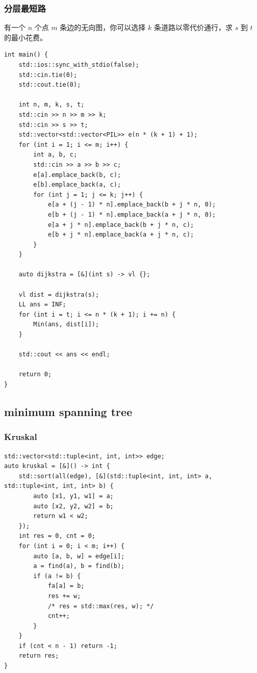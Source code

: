 \documentclass[UTF8, a4paper, titlepage, twoside]{ctexart}
\begin{document}
\subsubsection*{ 分层最短路 }

有一个 $n$ 个点 $m$ 条边的无向图，你可以选择 $k$ 条道路以零代价通行，求 $s$ 到 $t$ 的最小花费。

\begin{lstlisting}[style=cpp]
int main() {
    std::ios::sync_with_stdio(false);
    std::cin.tie(0);
    std::cout.tie(0);

    int n, m, k, s, t;
    std::cin >> n >> m >> k;
    std::cin >> s >> t;
    std::vector<std::vector<PIL>> e(n * (k + 1) + 1);
    for (int i = 1; i <= m; i++) {
        int a, b, c;
        std::cin >> a >> b >> c;
        e[a].emplace_back(b, c);
        e[b].emplace_back(a, c);
        for (int j = 1; j <= k; j++) {
            e[a + (j - 1) * n].emplace_back(b + j * n, 0);
            e[b + (j - 1) * n].emplace_back(a + j * n, 0);
            e[a + j * n].emplace_back(b + j * n, c);
            e[b + j * n].emplace_back(a + j * n, c);
        }
    }

    auto dijkstra = [&](int s) -> vl {};

    vl dist = dijkstra(s);
    LL ans = INF;
    for (int i = t; i <= n * (k + 1); i += n) {
        Min(ans, dist[i]);
    }

    std::cout << ans << endl;

    return 0;
}
\end{lstlisting}

\subsection{ minimum spanning tree }
\subsubsection*{ Kruskal }
\begin{lstlisting}[style=cpp]
std::vector<std::tuple<int, int, int>> edge;
auto kruskal = [&]() -> int {
    std::sort(all(edge), [&](std::tuple<int, int, int> a, std::tuple<int, int, int> b) {
        auto [x1, y1, w1] = a;
        auto [x2, y2, w2] = b;
        return w1 < w2;
    });
    int res = 0, cnt = 0;
    for (int i = 0; i < m; i++) {
        auto [a, b, w] = edge[i];
        a = find(a), b = find(b);
        if (a != b) {
            fa[a] = b;
            res += w;
            /* res = std::max(res, w); */
            cnt++;
        }
    }
    if (cnt < n - 1) return -1;
    return res;
}
\end{lstlisting}
\end{document}

